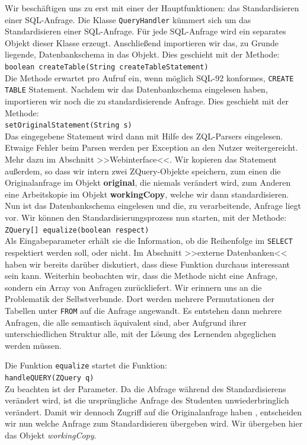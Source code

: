 Wir beschäftigen uns zu erst mit einer der Hauptfunktionen: das Standardisieren einer SQL-Anfrage. Die Klasse \verb|QueryHandler| kümmert sich um das Standardisieren einer SQL-Anfrage. Für jede SQL-Anfrage wird ein separates Objekt dieser Klasse erzeugt. Anschließend importieren wir das, zu Grunde liegende, Datenbankschema in das Objekt. Dies geschieht mit der Methode: \\\verb|boolean createTable(String createTableStatement)|\\
Die Methode erwartet pro Aufruf ein, wenn möglich SQL-92 konformes, \verb|CREATE TABLE| Statement. Nachdem wir das Datenbankschema eingelesen haben, importieren wir noch die zu standardisierende Anfrage. Dies geschieht mit der Methode:\\\verb|setOriginalStatement(String s)|\\ Das eingegebene Statement wird dann mit Hilfe des ZQL-Parsers eingelesen. Etwaige Fehler beim Parsen werden per Exception an den Nutzer weitergereicht. Mehr dazu im Abschnitt >>Webinterface<<. Wir kopieren das Statement außerdem, so dass wir intern zwei ZQuery-Objekte speichern, zum einen die Originalanfrage im Objekt \textbf{original}, die niemals verändert wird, zum Anderen eine Arbeitskopie im Objekt \textbf{workingCopy}, welche wir dann standardisieren. Nun ist das Datenbankschema eingelesen und die, zu verarbeitende, Anfrage liegt vor. Wir können den Standardisierungsprozess nun starten, mit der Methode: \\\verb|ZQuery[] equalize(boolean respect)|\\ 
Als Eingabeparameter erhält sie die Information, ob die Reihenfolge im \verb|SELECT| respektiert werden soll, oder nicht. Im Abschnitt >>externe Datenbanken<< haben wir bereits darüber diskutiert, dass diese Funktion durchaus interessant sein kann. Weiterhin beobachten wir, dass die Methode nicht eine Anfrage, sondern ein Array von Anfragen zurückliefert. Wir erinnern uns an die Problematik der Selbstverbunde. Dort werden mehrere Permutationen der Tabellen unter \verb|FROM| auf die Anfrage angewandt. Es entstehen dann mehrere Anfragen, die alle semantisch äquivalent sind, aber Aufgrund ihrer unterschiedlichen Struktur alle, mit der Lösung des Lernenden abgeglichen werden müssen.

Die Funktion \verb|equalize| startet die Funktion:\\
\verb|handleQUERY(ZQuery q)|\\Zu beachten ist der Parameter. Da die Abfrage während des Standardisierens verändert wird, ist die ursprüngliche Anfrage des Studenten unwiederbringlich verändert. Damit wir dennoch Zugriff auf die Originalanfrage haben , entscheiden wir nun welche Anfrage zum Standardisieren übergeben wird. Wir übergeben hier das Objekt \textit{workingCopy}.

